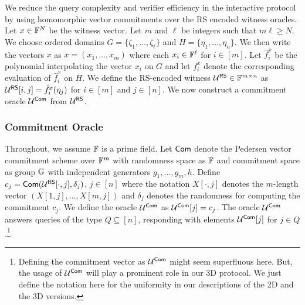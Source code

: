 We reduce the query complexity and verifier efficiency in the interactive protocol by
using homomorphic vector commitments over the RS encoded witness oracles. Let
$x\in \mathbb{F}^N$ be the witness vector. Let $m$ and $\ell$ be integers such that
$m\ell\geq N$. We choose ordered domains $G=\{\zeta_1,\ldots,\zeta_\ell\}$ and
$H=\{\eta_1,\ldots,\eta_n\}$. We then write the vectors $x$ as $x =
(x_{1},\ldots,x_{m})$ where each $x_{i}\in \mathbb{F}^\ell$ for $i \in [m]$. 
Let $\hat{f}^x_{i}$ be the polynomial interpolating the vector $x_{i}$
on $G$ and let $f^x_{i}$ denote the corresponding evaluation of
$\hat{f}^x_{i}$ on $H$. We define the RS-encoded witness $\mathcal{U}^{\mathsf{RS}}\in
\mathbb{F}^{m\times n}$ as $\mathcal{U}^{\mathsf{RS}}[i,j]=\hat{f}^x_{i}(\eta_j)$ for $i\in
[m]$ and $j\in [n]$. We now construct a commitment oracle $\mathcal{U}^{\mathsf{Com}}$ from $\mathcal{U}^{\mathsf{RS}}$.

\subsubsection{Commitment Oracle}
Throughout, we assume $\mathbb{F}$ is a prime field. Let $\mathsf{Com}$ denote the Pedersen
vector commitment scheme over $\mathbb{F}^m$ with randomness space as $\mathbb{F}$ and
commitment space as group $\mathbb{G}$ with independent generators $g_1,\ldots,g_m, h$. 
Define $c_{j} = \mathsf{Com}(\mathcal{U}^{\mathsf{RS}}[\cdot,j],\delta_{j})$, $j\in [n]$ where the notation $X[\cdot,j]$
denotes the $m$-length vector $(X[1,j],\ldots,X[m,j])$ and $\delta_{j}$
denotes the randomness for computing the commitment $c_{j}$. We
define the oracle $\mathcal{U}^{\mathsf{Com}}$ as $\mathcal{U}^{\mathsf{Com}}[j]=c_{j}$. The oracle
$\mathcal{U}^{\mathsf{Com}}$ answers queries of the type $Q\subseteq [n]$, responding with
elements $\mathcal{U}^{\mathsf{Com}}[j]$ for $j\in Q$.\footnote{Defining the commitment vector as 
$\mathcal{U}^{\mathsf{Com}}$ might seem superfluous here. But, the usage of $\mathcal{U}^{\mathsf{Com}}$ will play 
a prominent role in our 3D protocol. We just define the notation here for the uniformity 
in our descriptions of the 2D and the 3D versions.} 

